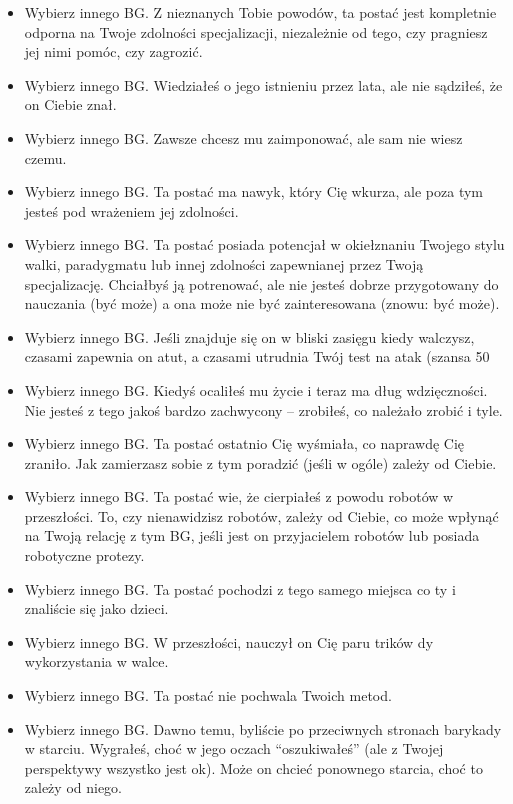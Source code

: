 \begin{itemize}
\item Wybierz innego BG. Z nieznanych Tobie powodów, ta postać jest kompletnie odporna na Twoje zdolności specjalizacji, niezależnie od tego, czy pragniesz jej nimi pomóc, czy zagrozić.
\item Wybierz innego BG. Wiedziałeś o jego istnieniu przez lata, ale nie sądziłeś, że on Ciebie znał.
\item Wybierz innego BG. Zawsze chcesz mu zaimponować, ale sam nie wiesz czemu.
\item Wybierz innego BG. Ta postać ma nawyk, który Cię wkurza, ale poza tym jesteś pod wrażeniem jej zdolności.
\item Wybierz innego BG. Ta postać posiada potencjał w okiełznaniu Twojego stylu walki, paradygmatu lub innej zdolności zapewnianej przez Twoją specjalizację. Chciałbyś ją potrenować, ale nie jesteś dobrze przygotowany do nauczania (być może) a ona może nie być zainteresowana (znowu: być może).
\item Wybierz innego BG. Jeśli znajduje się on w bliski zasięgu kiedy walczysz, czasami zapewnia on atut, a czasami utrudnia Twój test na atak (szansa 50%
\item Wybierz innego BG. Kiedyś ocaliłeś mu życie i teraz ma dług wdzięczności. Nie jesteś z tego jakoś bardzo zachwycony – zrobiłeś, co należało zrobić i tyle.
\item Wybierz innego BG. Ta postać ostatnio Cię wyśmiała, co naprawdę Cię zraniło. Jak zamierzasz sobie z tym poradzić (jeśli w ogóle) zależy od Ciebie.
\item Wybierz innego BG. Ta postać wie, że cierpiałeś z powodu robotów w przeszłości. To, czy nienawidzisz robotów, zależy od Ciebie, co może wpłynąć na Twoją relację z tym BG, jeśli jest on przyjacielem robotów lub posiada robotyczne protezy.
\item Wybierz innego BG. Ta postać pochodzi z tego samego miejsca co ty i znaliście się jako dzieci. 
\item Wybierz innego BG. W przeszłości, nauczył on Cię paru trików dy wykorzystania w walce.
\item Wybierz innego BG. Ta postać nie pochwala Twoich metod.
\item Wybierz innego BG. Dawno temu, byliście po przeciwnych stronach barykady w starciu. Wygrałeś, choć w jego oczach “oszukiwałeś” (ale z Twojej perspektywy wszystko jest ok). Może on chcieć ponownego starcia, choć to zależy od niego.

\end{itemize}

